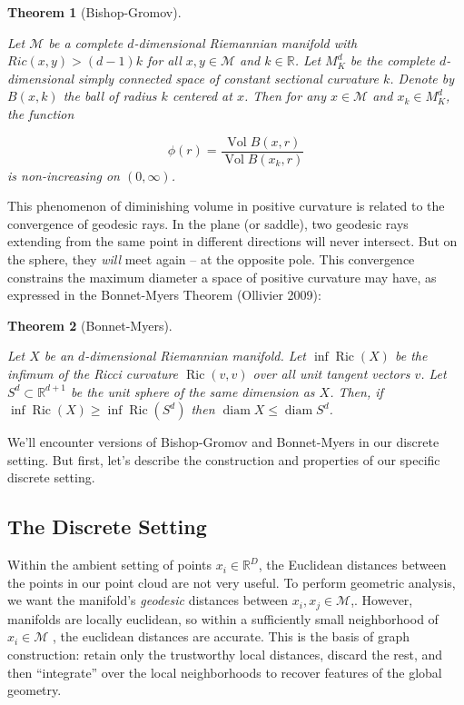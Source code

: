 \documentclass[
  letterpaper,
  DIV=11,
  numbers=noendperiod]{scrartcl}
\theoremstyle{plain}
\newtheorem{theorem}{Theorem}[section]
\theoremstyle{definition}
\theoremstyle{plain}
\theoremstyle{definition}
\theoremstyle{plain}
\theoremstyle{remark}
\begin{document}
\begin{theorem}[Bishop-Gromov]\protect\hypertarget{thm-bishop-gromov}{}\label{thm-bishop-gromov}

Let \(\mathcal{M}\) be a complete \(d\)-dimensional Riemannian manifold
with \(Ric(x,y) > (d - 1)k\) for all \(x,y \in \mathcal{M}\) and
\(k \in \mathbb{R}\). Let \(M_{K}^d\) be the complete \(d\)-dimensional
simply connected space of constant sectional curvature \(k\). Denote by
\(B(x,k)\) the ball of radius \(k\) centered at \(x\). Then for any
\(x \in \mathcal{M}\) and \(x_{k} \in M_{K}^d\), the function

\[
\phi(r) = \frac{\operatorname{Vol}B(x,r)}{\operatorname{Vol}B(x_{k},r)}
\] is non-increasing on \((0,\infty)\).

\end{theorem}

This phenomenon of diminishing volume in positive curvature is related
to the convergence of geodesic rays. In the plane (or saddle), two
geodesic rays extending from the same point in different directions will
never intersect. But on the sphere, they \emph{will} meet again -- at
the opposite pole. This convergence constrains the maximum diameter a
space of positive curvature may have, as expressed in the Bonnet-Myers
Theorem (Ollivier 2009):

\begin{theorem}[Bonnet-Myers]\protect\hypertarget{thm-bonnet-myers}{}\label{thm-bonnet-myers}

Let \(X\) be an \(d\)-dimensional Riemannian manifold. Let
\(\inf \operatorname{Ric}(X)\) be the infimum of the Ricci curvature
\(\operatorname{Ric}(v, v)\) over all unit tangent vectors \(v\). Let
\(S^d \subset \mathbb{R}^{d+1}\) be the unit sphere of the same
dimension as \(X\). Then, if
\(\inf \operatorname{Ric}(X) \geqslant \inf \operatorname{Ric}\left(S^d\right)\)
then \(\operatorname{diam} X \leqslant \operatorname{diam} S^d\).

\end{theorem}

We'll encounter versions of Bishop-Gromov and Bonnet-Myers in our
discrete setting. But first, let's describe the construction and
properties of our specific discrete setting.

\subsection{The Discrete Setting}\label{the-discrete-setting}

Within the ambient setting of points \(x_{i} \in \mathbb{R}^D\), the
Euclidean distances between the points in our point cloud are not very
useful. To perform geometric analysis, we want the manifold's
\emph{geodesic} distances between \(x_{i}, x_{j} \in \mathcal{M}\),.
However, manifolds are locally euclidean, so within a sufficiently small
neighborhood of \(x_{i} \in \mathcal{M}\) , the euclidean distances are
accurate. This is the basis of graph construction: retain only the
trustworthy local distances, discard the rest, and then ``integrate''
over the local neighborhoods to recover features of the global geometry.
\end{document}
